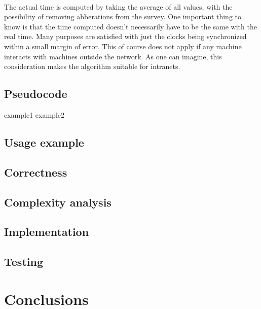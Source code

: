 \documentclass[12pt]{article}
\begin{document}
\paragraph{}
The actual time is computed by taking the average of all values, with the possibility of removing abberations from the survey. One important thing to know is that the time computed doesn't necessarily have to be the same with the real time. Many purposes are satisfied with just the clocks being synchronized within a small margin of error. This of course does not apply if any machine interacts with machines outside the network. As one can imagine, this consideration makes the algorithm suitable for intranets.


\subsection{Pseudocode}
example1 \cite{tanenbaum2007distributed}
example2 \cite{gusella1989accuracy}


\subsection{Usage example}

\subsection{Correctness}

\subsection{Complexity analysis}

\subsection{Implementation}

\subsection{Testing}

\section{Conclusions}

\printbibliography
\end{document}
